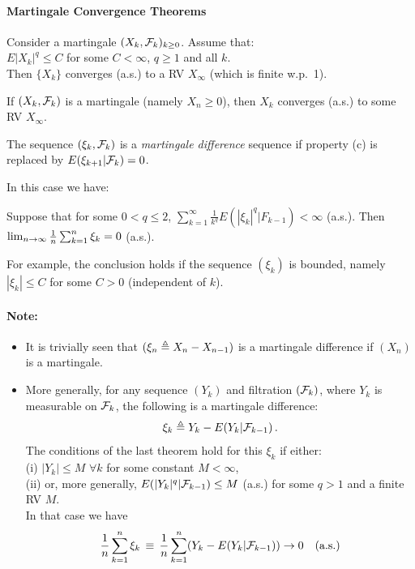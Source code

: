 \paragraph{Martingale Convergence Theorems}
\begin{theorem} Consider a martingale $(X_k, \mathcal F_k)_{k\ge 0}$.
Assume that:\\
\hspace*{1in} $E|X_k|^q \le C$ for some $C<\infty$, $q \ge 1$ and all $k$.\\
Then
$\{X_k\}$ converges (a.s.) to a RV $X_\infty$ (which is finite w.p.\  1).
\end{theorem}
\begin{theorem} If $(X_k, \mathcal F_k)$ is
a 
martingale (namely $X_n \ge 0$), then $X_k$ converges (a.s.) to some RV $X_\infty$.
\end{theorem}

\begin{definition}
The sequence $(\xi_k, \mathcal F_k)$ is a {\em martingale difference} sequence if
property (c) is replaced by $E(\xi_{k+1}| \mathcal F_k) = 0$.
\end{definition}
In this case we have:
\begin{theorem} Suppose that for some $0 < q \le 2$,
$\sum_{k=1}^\infty \frac{1}{k^q} E (|\xi_k|^q | F_{k-1}) < \infty$ (a.s.).
Then $\lim_{n \to \infty} \frac{1}{n} \sum_{k=1}^n \xi_k = 0$ (a.s.).
\end{theorem}

For example, the conclusion holds if the sequence $(\xi_k)$ is bounded,
namely $|\xi_k| \le C$ for some $C>0$ (independent of $k$).


\paragraph{Note:}
\begin{itemize}
\item
It is trivially seen that $(\xi_n\triangleq X_n-X_{n-1})$ is a martingale difference
if $(X_n)$ is a martingale.
\item
More generally, for any sequence $(Y_k)$ and filtration $(\mathcal F_k)$, where
$Y_k$ is measurable on $\mathcal F_k$,
the following is a martingale difference:
$$
\xi_k \triangleq Y_k - E(Y_k | \mathcal F_{k-1})\,.
$$
The conditions of the last theorem hold for this $\xi_k$ if either:\\
(i) $|Y_k | \le M$ $\forall k$ for some constant $M < \infty$,\\
(ii) or, more generally, $E(|Y_k|^q | \mathcal F_{k-1}) \le M$ (a.s.) for some $q>1$ and
a finite RV $M$.\\
In that case we have
$$
\frac{1}{n} \sum_{k=1}^n \xi_k \,\equiv\, \frac{1}{n}
\sum_{k=1}^n ( Y_k - E (Y_k | \mathcal F_{k-1})) \to 0 \quad \text{(a.s.)}
$$
\end{itemize}


